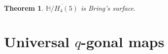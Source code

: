 \documentclass{amsproc}
\numberwithin{equation}{section}
\numberwithin{equation}{section}
\newtheorem{theorem}{Theorem}[section]
\theoremstyle{definition}
\newtheorem{definition}[theorem]{Definition}
\theoremstyle{remark}
\numberwithin{equation}{section}
\begin{document}
 \begin{theorem}  
 $\overline {\mathbb{H}/H_4(5)}$ is Bring's surface.
   \end{theorem}

 



 \section{Universal $q$-gonal maps}
\end{document}

